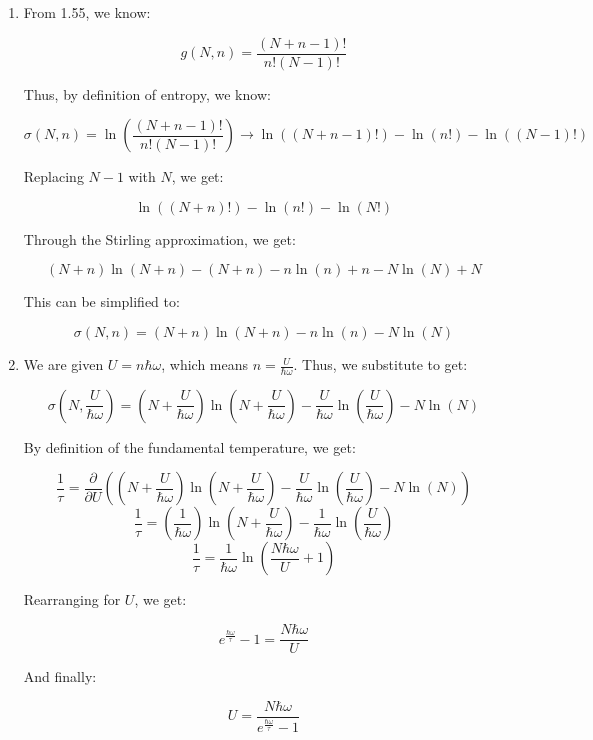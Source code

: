 \begin{enumerate}
    \begin{enumerate}

      \item 

        From 1.55, we know:

        $$g(N,n)=\frac{(N+n-1)!}{n!(N-1)!}$$

        Thus, by definition of entropy, we know:

        $$\sigma(N,n)=\ln\left( \frac{(N+n-1)!}{n!(N-1)!} \right)\rightarrow\ln( (N+n-1)!)-\ln(n!)-\ln ((N-1)!)$$

        Replacing $N-1$ with $N$, we get:

        $$\ln( (N+n)!)-\ln(n!)-\ln(N!)$$

        Through the Stirling approximation, we get:

        $$(N+n)\ln(N+n)-(N+n)-n\ln(n)+n-N\ln(N)+N$$

        This can be simplified to:

        $$\boxed{\sigma(N,n)=(N+n)\ln(N+n)-n\ln(n)-N\ln(N)}$$

      \item 

        We are given $U=n\hbar\omega$, which means $n=\frac{U}{\hbar\omega}$. Thus, we substitute to get:

        $$\sigma\left(N,\frac{U}{\hbar\omega}\right)=\left(N+\frac{U}{\hbar\omega}\right)\ln\left( N+\frac{U}{\hbar\omega} \right)-\frac{U}{\hbar\omega}\ln\left( \frac{U}{\hbar\omega} \right)-N\ln(N)$$

        By definition of the fundamental temperature, we get:

        $$\frac{1}{\tau}=\frac{\partial}{\partial U}\left(  \left(N+\frac{U}{\hbar\omega}\right)\ln\left( N+\frac{U}{\hbar\omega} \right)-\frac{U}{\hbar\omega}\ln\left( \frac{U}{\hbar\omega} \right)-N\ln(N)\right)$$
        $$\frac{1}{\tau}=\left( \frac{1}{\hbar\omega}\right)\ln\left( N+\frac{U}{\hbar\omega} \right)-\frac{1}{\hbar\omega}\ln\left( \frac{U}{\hbar\omega} \right)$$
        $$\frac{1}{\tau}=\frac{1}{\hbar\omega}\ln\left( \frac{N\hbar\omega}{U}+1 \right)$$

        Rearranging for $U$, we get:

        $$e^{\frac{\hbar\omega}{\tau}}-1=\frac{N\hbar\omega}{U}$$

        And finally:

        $$\boxed{U=\frac{N\hbar\omega}{e^{\frac{\hbar\omega}{\tau}}-1}}$$

    \end{enumerate}
    

\end{enumerate}
